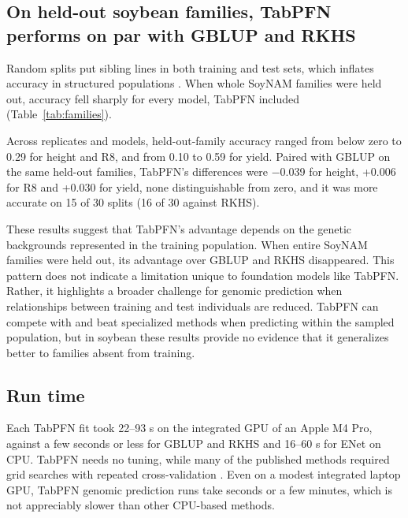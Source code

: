 \documentclass[11pt]{article}
\begin{document}
\subsection{On held-out soybean families, TabPFN performs on par with GBLUP and RKHS}

Random splits put sibling lines in both training and test sets, which inflates accuracy in structured populations \citep{habier2007,werner2020}. When whole SoyNAM families were held out, accuracy fell sharply for every model, TabPFN included (Table~\ref{tab:families}).

\begin{table}[tbp]
\centering
\caption{Soybean accuracy (Pearson $r$) with whole SoyNAM families held out, with GBLUP on random splits for reference. *In 5 of 10 height fits and 1 of 10 R8 fits, the elastic net kept no markers and predicted a constant, so the correlation is undefined; those fits are counted as $r = 0$.}
\label{tab:families}
\small

\end{table}

Across replicates and models, held-out-family accuracy ranged from below zero to 0.29 for height and R8, and from 0.10 to 0.59 for yield. Paired with GBLUP on the same held-out families, TabPFN's differences were −0.039 for height, +0.006 for R8 and +0.030 for yield, none distinguishable from zero, and it was more accurate on 15 of 30 splits (16 of 30 against RKHS).

These results suggest that TabPFN's advantage depends on the genetic backgrounds represented in the training population. When entire SoyNAM families were held out, its advantage over GBLUP and RKHS disappeared. This pattern does not indicate a limitation unique to foundation models like TabPFN. Rather, it highlights a broader challenge for genomic prediction when relationships between training and test individuals are reduced. TabPFN can compete with and beat specialized methods when predicting within the sampled population, but in soybean these results provide no evidence that it generalizes better to families absent from training.

\subsection{Run time}

Each TabPFN fit took 22--93 s on the integrated GPU of an Apple M4 Pro, against a few seconds or less for GBLUP and RKHS and 16--60 s for ENet on CPU. TabPFN needs no tuning, while many of the published methods required grid searches with repeated cross-validation \citep{azodi2019}. Even on a modest integrated laptop GPU, TabPFN genomic prediction runs take seconds or a few minutes, which is not appreciably slower than other CPU-based methods.
\end{document}
